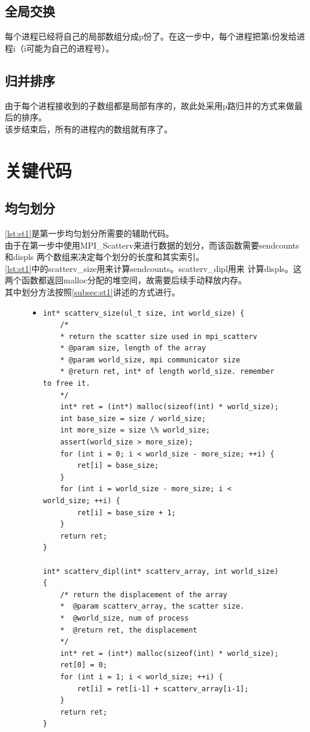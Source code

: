 \documentclass[a4paper]{article}
\begin{document}
\subsection{全局交换}
每个进程已经将自己的局部数组分成p份了。在这一步中，每个进程把第i份发给进程i（i可能为自己的进程号）。
\subsection{归并排序}
由于每个进程接收到的子数组都是局部有序的，故此处采用p路归并的方式来做最后的排序。\\

该步结束后，所有的进程内的数组就有序了。
\section{关键代码}
\subsection{均匀划分}
\autoref{lst:st1}是第一步均匀划分所需要的辅助代码。\\

由于在第一步中使用MPI\_Scatterv来进行数据的划分，而该函数需要sendcounts和displs
两个数组来决定每个划分的长度和其实索引。\\

\autoref{lst:st1}中的scatterv\_size用来计算sendcounts。scatterv\_dipl用来
计算displs。这两个函数都返回malloc分配的堆空间，故需要后续手动释放内存。\\

其中划分方法按照\autoref{subsec:st1}讲述的方式进行。
\begin{figure}[!hbt]
\begin{itemize}
\item[] \begin{lstlisting}[style=mycpp, label=lst:st1, caption=均匀划分步骤的部分代码]
int* scatterv_size(ul_t size, int world_size) {
    /* 
    * return the scatter size used in mpi_scatterv
    * @param size, length of the array
    * @param world_size, mpi communicator size
    * @return ret, int* of length world_size. remember to free it.
    */
    int* ret = (int*) malloc(sizeof(int) * world_size);
    int base_size = size / world_size;
    int more_size = size \% world_size;
    assert(world_size > more_size);
    for (int i = 0; i < world_size - more_size; ++i) {
        ret[i] = base_size;
    }
    for (int i = world_size - more_size; i < world_size; ++i) {
        ret[i] = base_size + 1;
    }
    return ret;
}

int* scatterv_dipl(int* scatterv_array, int world_size) {
    /* return the displacement of the array
    *  @param scatterv_array, the scatter size.
    *  @world_size, num of process
    *  @return ret, the displacement
    */
    int* ret = (int*) malloc(sizeof(int) * world_size);
    ret[0] = 0;
    for (int i = 1; i < world_size; ++i) {
        ret[i] = ret[i-1] + scatterv_array[i-1];
    }
    return ret;
}
\end{lstlisting}
\end{itemize}
\end{figure}
\end{document}
